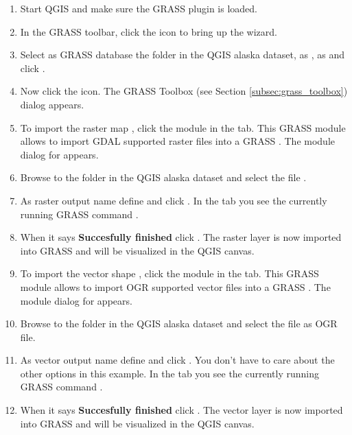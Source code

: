 \begin{enumerate}
  \item Start QGIS and make sure the GRASS plugin is loaded.
  \item In the GRASS toolbar, click the  icon to bring up the  wizard.
  \item Select as GRASS database the folder  in the QGIS 
  alaska dataset, as , as  
   and click .
  \item Now click the  icon. The 
  GRASS Toolbox (see Section \ref{subsec:grass_toolbox}) dialog appears.
  \item To import the raster map , click the module 
   in the  tab. This GRASS module 
  allows to import GDAL supported raster files into a GRASS 
  . The module dialog for  appears.
  \item Browse to the folder  in the QGIS alaska dataset 
  and select the file .
  \item As raster output name define  and click 
  . In the  tab you see the currently running GRASS 
  command .
  \item When it says \textbf{Succesfully finished} click . 
  The  raster layer is now imported into GRASS and 
  will be visualized in the QGIS canvas.
  \item To import the vector shape , click the module 
   in the  tab. This GRASS module allows 
  to import OGR supported vector files into a GRASS . The 
  module dialog for  appears.
  \item Browse to the folder  in the QGIS alaska 
  dataset and select the file  as OGR file.
  \item As vector output name define  and click 
  . You don't have to care about the other options in this 
  example. In the  tab you see the currently running GRASS 
  command .
  \item When it says \textbf{Succesfully finished} click . 
  The  vector layer is now imported into GRASS and will 
  be visualized in the QGIS canvas. 
\end{enumerate}


